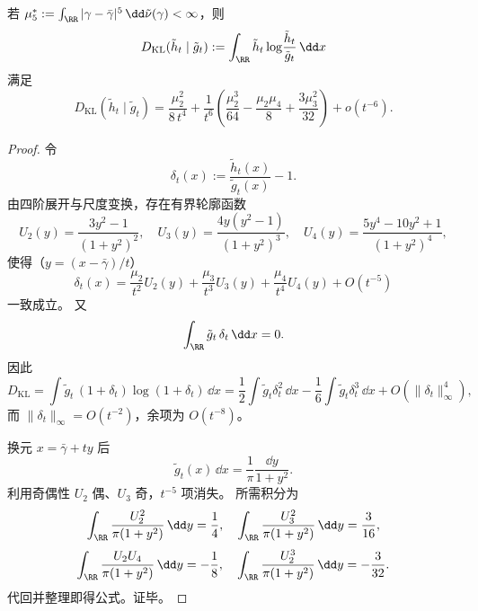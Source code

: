 \begin{theorem}[KL 相对熵的六阶精细渐近]\label{thm:conclusion-poisson-cauchy-kl-sixth-order-expansion}
若 \(\mu_5^\ast:=\int_{\RR}|\gamma-\bar\gamma|^5\,\dd\tilde\nu(\gamma)<\infty\)，则
\[
D_{\mathrm{KL}}(\tilde h_t\mid \tilde g_t)
:=
\int_{\RR}\tilde h_t\log\!\frac{\tilde h_t}{\tilde g_t}\,\dd x
\]
满足
\[
D_{\mathrm{KL}}(\tilde h_t\mid \tilde g_t)
=
\frac{\mu_2^2}{8\,t^4}
+
\frac1{t^6}\left(
\frac{\mu_2^3}{64}
-\frac{\mu_2\mu_4}{8}
+\frac{3\mu_3^2}{32}
\right)
+o(t^{-6}).
\]
\end{theorem}
\begin{proof}
令
\[
\delta_t(x):=\frac{\tilde h_t(x)}{\tilde g_t(x)}-1.
\]
由四阶展开与尺度变换，存在有界轮廓函数
\[
U_2(y)=\frac{3y^2-1}{(1+y^2)^2},\quad
U_3(y)=\frac{4y(y^2-1)}{(1+y^2)^3},\quad
U_4(y)=\frac{5y^4-10y^2+1}{(1+y^2)^4},
\]
使得（\(y=(x-\bar\gamma)/t\)）
\[
\delta_t(x)=\frac{\mu_2}{t^2}U_2(y)+\frac{\mu_3}{t^3}U_3(y)+\frac{\mu_4}{t^4}U_4(y)+O(t^{-5})
\]
一致成立。
又
\[
\int_{\RR}\tilde g_t\,\delta_t\,\dd x=0.
\]
因此
\[
D_{\mathrm{KL}}
=
\int \tilde g_t\,(1+\delta_t)\log(1+\delta_t)\,\dd x
=
\frac12\int\tilde g_t\delta_t^2\,\dd x
-\frac16\int\tilde g_t\delta_t^3\,\dd x
+O(\|\delta_t\|_\infty^4),
\]
而 \(\|\delta_t\|_\infty=O(t^{-2})\)，余项为 \(O(t^{-8})\)。

换元 \(x=\bar\gamma+ty\) 后
\[
\tilde g_t(x)\,\dd x=\frac1\pi\frac{\dd y}{1+y^2}.
\]
利用奇偶性 \(U_2\) 偶、\(U_3\) 奇，\(t^{-5}\) 项消失。
所需积分为
\[
\int_{\RR}\frac{U_2^2}{\pi(1+y^2)}\,\dd y=\frac14,\quad
\int_{\RR}\frac{U_3^2}{\pi(1+y^2)}\,\dd y=\frac{3}{16},
\]
\[
\int_{\RR}\frac{U_2U_4}{\pi(1+y^2)}\,\dd y=-\frac18,\quad
\int_{\RR}\frac{U_2^3}{\pi(1+y^2)}\,\dd y=-\frac{3}{32}.
\]
代回并整理即得公式。证毕。
\end{proof}

